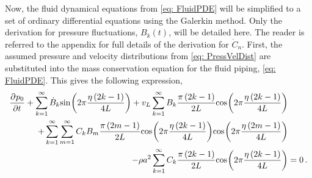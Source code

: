 Now, the fluid dynamical equations from \cref{eq: FluidPDE} will be simplified to a set of ordinary differential equations using the Galerkin method. Only the derivation for pressure fluctuations, $B_k(t)$, will be detailed here. The reader is referred to the appendix for full details of the derivation for $\dot{C}_n$. First, the assumed pressure and velocity distributions from \cref{eq: PressVelDist} are substituted into the mass conservation equation for the fluid piping, \cref{eq: FluidPDE}. This gives the following expression,
~
\begin{equation*}
\begin{split}
    \pdiff{p_0}{t}
    + \sum_{k=1}^{\infty} \dot{B}_k \fun{sin}{2\pi \frac{\eta \left( 2 k - 1 \right)}{4L}}
    + v_L \sum_{k=1}^{\infty} B_k \frac{\pi \left( 2 k - 1 \right)}{2L} \fun{cos}{2\pi \frac{\eta \left( 2 k - 1 \right)}{4L}} 
    & \\ %
    + \sum_{k=1}^{\infty} \sum_{m=1}^{\infty} C_k B_m \frac{\pi \left( 2 m - 1 \right)}{2L} \fun{cos}{2\pi \frac{\eta \left( 2 k - 1 \right)}{4L}} \fun{cos}{2\pi \frac{\eta \left( 2 m - 1 \right)}{4L}} 
    & \\ %
    - \rho a^2 \sum_{k=1}^{\infty} C_k \frac{\pi \left( 2 k - 1 \right)}{2L} \fun{cos}{2\pi \frac{\eta \left( 2 k - 1 \right)}{4L}}
    &= 0 \, .
\end{split}
\end{equation*}


